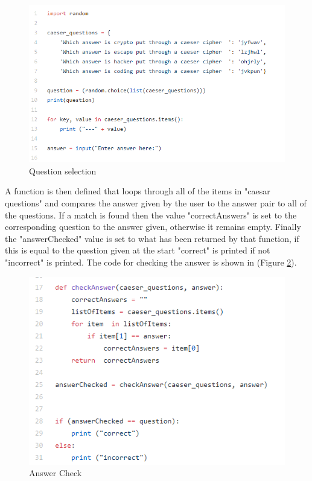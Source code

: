 \documentclass[12pt,a4paper]{article}
\begin{document}
\begin{figure}[h]
    \centering
    \includegraphics[width=1.0\textwidth]{Figs/random1.PNG} 
    \caption{Question selection} 
    \label{Random1}
\end{figure}   

A function is then defined that loops through all of the items in "caesar questions" and compares the answer given by the user to the answer pair to all of the questions. If a match is found then the value "correctAnswers" is set to the corresponding question to the answer given, otherwise it remains empty. Finally the "answerChecked" value is set to what has been returned by that function, if this is equal to the question given at the start "correct" is printed if not "incorrect" is printed. The code for checking the answer is shown in (Figure \ref{Random2}).

\begin{figure}[h]
    \centering
    \includegraphics[width=1.0\textwidth]{Figs/random2.PNG} 
    \caption{Answer Check} 
    \label{Random2}
\end{figure} 
\end{document}
